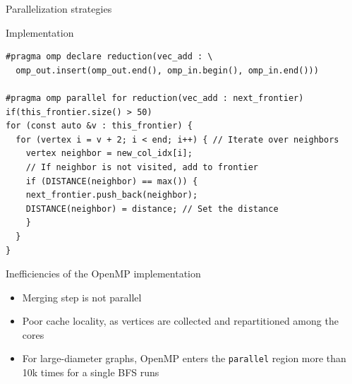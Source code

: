 \begin{frame}{Parallelization strategies}
{
}
\end{frame}

\begin{frame}[fragile]{Implementation}
\begin{verbatim}
#pragma omp declare reduction(vec_add : \
  omp_out.insert(omp_out.end(), omp_in.begin(), omp_in.end()))

#pragma omp parallel for reduction(vec_add : next_frontier) if(this_frontier.size() > 50)
for (const auto &v : this_frontier) {
  for (vertex i = v + 2; i < end; i++) { // Iterate over neighbors
    vertex neighbor = new_col_idx[i];
    // If neighbor is not visited, add to frontier
    if (DISTANCE(neighbor) == max()) {
    next_frontier.push_back(neighbor);
    DISTANCE(neighbor) = distance; // Set the distance
    }
  }
}
\end{verbatim}
\end{frame}

\begin{frame}{Inefficiencies of the OpenMP implementation}
  \begin{itemize}
    \item Merging step is not parallel
    \pause
    \item Poor cache locality, as vertices are collected and repartitioned among the cores
    \pause
    \item For \alert{large-diameter graphs}, OpenMP enters the \texttt{parallel} region more than 10k times for a single BFS runs
  \end{itemize}
\end{frame}